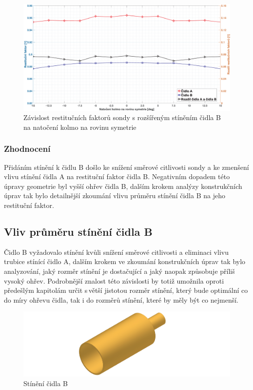              \begin{figure}[ht!]
                \centering
                \includegraphics*[width=\textwidth]{400_SIMULACE_KONSTRUKCNICH_UPRAV/Grafy/03_kolma_rovina}
                \caption{Závislost restitučních faktorů sondy s rozšířeným stíněním čidla B na natočení kolmo na rovinu symetrie}
                \label{fig:sonda-s-rosirenym-stinenim-kolma-rovina}
            \end{figure}

        \subsubsection{Zhodnocení}
            Přidáním stínění k čidlu B došlo ke snížení směrové citlivosti sondy a ke zmenšení vlivu stínění čidla A na restituční faktor čidla B. Negativním dopadem této úpravy geometrie byl vyšší ohřev čidla B, dalším krokem analýzy konstrukčních úprav tak bylo detailnější zkoumání vlivu průměru stínění čidla B na jeho restituční faktor.
    
    \newpage
    \subsection{Vliv průměru stínění čidla B}
        Čidlo B vyžadovalo stínění kvůli snížení směrové citlivosti a eliminaci vlivu trubice stínící čidlo A, dalším krokem ve zkoumání konstrukčních úprav tak bylo analyzování, jaký rozměr stínění je dostačující a jaký naopak způsobuje příliš vysoký ohřev. Podrobnější znalost této závislosti by totiž umožnila oproti předešlým kapitolám určit s\,větší jistotou rozměr stínění, který bude optimální co do míry ohřevu čidla, tak i do rozměrů stínění, které by měly být co nejmenší. 
        \begin{figure}[ht!]
            \centering
            \includegraphics[width=\textwidth]{400_SIMULACE_KONSTRUKCNICH_UPRAV/Vykresy_rendery/Stineni_B.png}
            \caption{Stínění čidla B}
            \label{fig:stineni-B}
        \end{figure}

